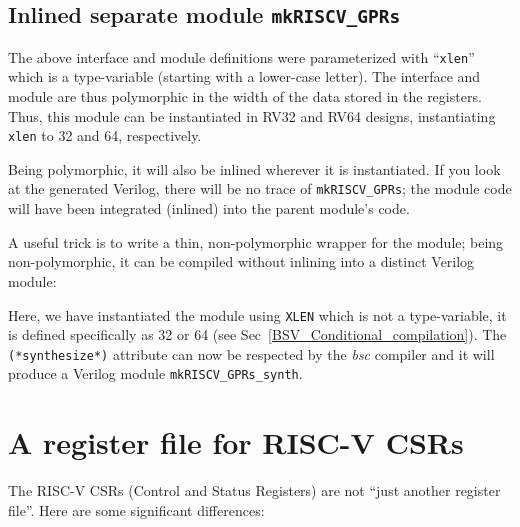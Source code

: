 \subsection{Inlined {\vs} separate module {\tt mkRISCV\_GPRs}}

The above interface and module definitions were parameterized with
``\verb|xlen|'' which is a type-variable (starting with a lower-case
letter).  The interface and module are thus polymorphic in the width
of the data stored in the registers.  Thus, this module can be
instantiated in RV32 and RV64 designs, instantiating \verb|xlen| to 32
and 64, respectively.

Being polymorphic, it will also be inlined wherever it is
instantiated.  If you look at the generated Verilog, there will be no
trace of \verb|mkRISCV_GPRs|; the module code will have been
integrated (inlined) into the parent module's code.

A useful trick is to write a thin, non-polymorphic wrapper for the
module; being non-polymorphic, it can be compiled without inlining
into a distinct Verilog module:




Here, we have instantiated the module using \verb|XLEN| which is not a
type-variable, it is defined specifically as 32 or 64 (see
Sec~\ref{BSV_Conditional_compilation}).  The \verb|(*synthesize*)|
attribute can now be respected by the \emph{bsc} compiler and it will
produce a Verilog module \verb|mkRISCV_GPRs_synth|.


\section{A register file for RISC-V CSRs}

\label{Sec_RISCV_CSRs}

The RISC-V CSRs (Control and Status Registers) are not ``just another
register file''.  Here are some significant differences:

